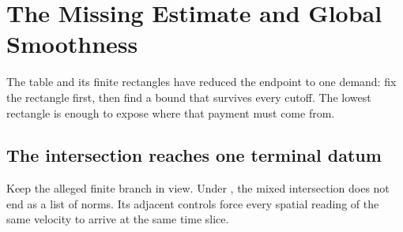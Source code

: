 \clearpage
\section{The Missing Estimate and Global Smoothness}\label{sec:TheMissingEstimateAndGlobalSmoothness}

The table and its finite rectangles have reduced the endpoint to one demand:
fix the rectangle first, then find a bound that survives every cutoff.  The
lowest rectangle is enough to expose where that payment must come from.



\subsection{The intersection reaches one terminal datum}\label{sub:NoFiniteSingularTime}

Keep the alleged finite branch in view.  Under
, the mixed intersection does not
end as a list of norms.  Its adjacent controls force every spatial reading of
the same velocity to arrive at the same time slice.


